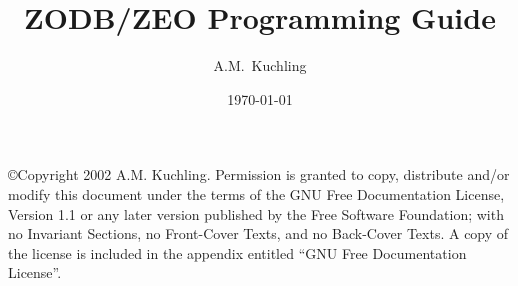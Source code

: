 \documentclass{howto}
\title{ZODB/ZEO Programming Guide}
\date{\today}
\author{A.M.\ Kuchling}
\begin{document}
\maketitle
\tableofcontents

\copyright{Copyright 2002 A.M. Kuchling.
      Permission is granted to copy, distribute and/or modify this document
      under the terms of the GNU Free Documentation License, Version 1.1
      or any later version published by the Free Software Foundation;
      with no Invariant Sections, no Front-Cover Texts, and no Back-Cover Texts.
      A copy of the license is included in the appendix entitled ``GNU
      Free Documentation License''.}





%
%
%


\appendix


\end{document}
